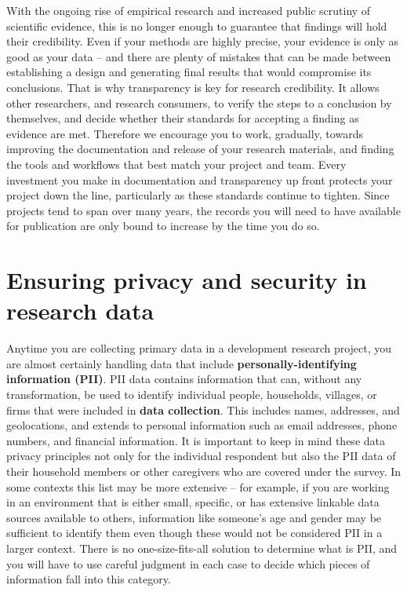 With the ongoing rise of empirical research and increased public scrutiny of scientific evidence,
this is no longer enough to guarantee that findings will hold their credibility.
Even if your methods are highly precise,
your evidence is only as good as your data --
and there are plenty of mistakes that can be made between
establishing a design and generating final results that would compromise its conclusions.
That is why transparency is key for research credibility.
It allows other researchers, and research consumers,
to verify the steps to a conclusion by themselves,
and decide whether their standards for accepting a finding as evidence are met.
Therefore we encourage you to work, gradually, towards improving
the documentation and release of your research materials,
and finding the tools and workflows that best match your project and team.
Every investment you make in documentation and transparency up front
protects your project down the line, particularly as these standards continue to tighten.
Since projects tend to span over many years,
the records you will need to have available for publication are
only bound to increase by the time you do so.



\section{Ensuring privacy and security in research data}

Anytime you are collecting primary data in a development research project,
you are almost certainly handling data that include \textbf{personally-identifying
	information (PII)}.
PII data contains information that can, without any transformation, be used to identify
individual people, households, villages, or firms that were included in \textbf{data collection}.
This includes names, addresses, and geolocations, and extends to personal information
such as email addresses, phone numbers, and financial information.
It is important to keep in mind these data privacy principles not only for the individual respondent but also the PII data of their household members or other caregivers who are covered under the survey.
In some contexts this list may be more extensive --
for example, if you are working in an environment that is either small, specific,
or has extensive linkable data sources available to others,
information like someone's age and gender may be sufficient to identify them
even though these would not be considered PII in a larger context.
There is no one-size-fits-all solution to determine what is PII, and you will have to use careful judgment in each case
to decide which pieces of information fall into this category.

